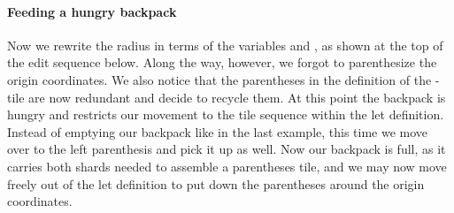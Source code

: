 \paragraph{Feeding a hungry backpack}
Now we rewrite the radius in terms of the variables
 and , as shown at the top of the
edit sequence below.
Along the way, however, we forgot to parenthesize
the origin coordinates.
We also notice that the parentheses in the definition
of the -tile are now redundant and decide
to recycle them.
At this point the backpack is hungry and restricts
our movement to the tile sequence within the
let definition.
Instead of emptying our backpack like in the
last example, this time we move over to the
left parenthesis and pick it up as well.
Now our backpack is full, as it carries both shards
needed to assemble a parentheses tile, and we may
now move freely out of the let definition
to put down the parentheses around the origin coordinates.

